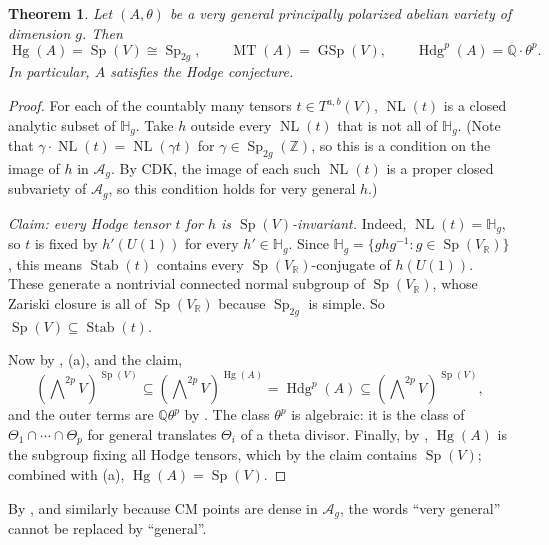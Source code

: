 \documentclass[12pt]{amsart}
\newcommand{\R}{\mathbb{R}}
\newcommand{\Q}{\mathbb{Q}}
\newcommand{\Z}{\mathbb{Z}}
\DeclareMathOperator{\Sp}{Sp}
\DeclareMathOperator{\GSp}{GSp}
\DeclareMathOperator{\MT}{MT}
\DeclareMathOperator{\Hg}{Hg}
\DeclareMathOperator{\Hdg}{Hdg}
\DeclareMathOperator{\NL}{NL}
\DeclareMathOperator{\Stab}{Stab}
\newcommand{\cA}{\mathcal{A}}
\newcommand{\HH}{\mathbb{H}}
\let\oldbigwedge\bigwedge
\renewcommand{\bigwedge}{\mathop{\textstyle\oldbigwedge}\nolimits}
\newtheorem{theorem}{Theorem}[section]
\theoremstyle{definition}
\theoremstyle{remark}
\numberwithin{equation}{section}
\begin{document}
\begin{theorem}\label{thm:very-general}
    Let $(A, \theta)$ be a very general principally polarized abelian variety
    of dimension $g$. Then
    \begin{equation*}
        \Hg(A) = \Sp(V) \cong \Sp_{2g}, \qquad \MT(A) = \GSp(V), \qquad
        \Hdg^p(A) = \Q \cdot \theta^p.
    \end{equation*}
    In particular, $A$ satisfies the Hodge conjecture.
\end{theorem}
\begin{proof}
    For each of the countably many tensors $t \in T^{a,b}(V)$, $\NL(t)$ is a
    closed analytic subset of $\HH_g$. Take $h$ outside every $\NL(t)$ that is
    not all of $\HH_g$. (Note that $\gamma \cdot \NL(t) = \NL(\gamma t)$ for
    $\gamma \in \Sp_{2g}(\Z)$, so this is a condition on the image of $h$ in
    $\cA_g$. By CDK, the image of each such $\NL(t)$ is a proper closed
    subvariety of $\cA_g$, so this condition holds for very general $h$.)

    \emph{Claim: every Hodge tensor $t$ for $h$ is $\Sp(V)$-invariant.}
    Indeed, $\NL(t) = \HH_g$, so $t$ is fixed by $h'(U(1))$ for every
    $h' \in \HH_g$. Since $\HH_g = \{g h g^{-1} : g \in \Sp(V_\R)\}$, this
    means $\Stab(t)$ contains every $\Sp(V_\R)$-conjugate of $h(U(1))$. These
    generate a nontrivial connected normal subgroup of $\Sp(V_\R)$, whose
    Zariski closure is all of $\Sp(V_\R)$ because $\Sp_{2g}$ is simple. So
    $\Sp(V) \subseteq \Stab(t)$.

    Now by , (a), and the claim,
    \begin{equation*}
        (\bigwedge^{2p} V)^{\Sp(V)} \subseteq (\bigwedge^{2p} V)^{\Hg(A)} =
        \Hdg^p(A) \subseteq (\bigwedge^{2p} V)^{\Sp(V)},
    \end{equation*}
    and the outer terms are $\Q \theta^p$ by . The class
    $\theta^p$ is algebraic: it is the class of
    $\Theta_1 \cap \cdots \cap \Theta_p$ for general translates $\Theta_i$ of a
    theta divisor. Finally, by , $\Hg(A)$ is the subgroup
    fixing all Hodge tensors, which by the claim contains $\Sp(V)$; combined
    with (a), $\Hg(A) = \Sp(V)$.
\end{proof}

\begin{remark}
    By , and similarly because CM points are dense in $\cA_g$, the
    words ``very general'' cannot be replaced by ``general''.
\end{remark}
\end{document}
